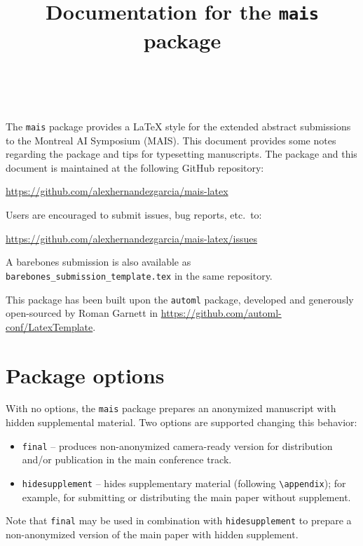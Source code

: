 \documentclass[11pt]{article}
\title{Documentation for the \texttt{mais} package}
\author[1]{\nameemail{Author 1}{email1@example.com}}
\author[2,3]{\nameemail{Author 2}{email2@example.com}}
\author[3]{\nameemail{Author 3}{email3@example.com}}
\author[4]{\nameemail{Author 4}{email4@example.com}}
\author[3]{\\\nameemail{Author 5}{email5@example.com}}
\affil[1]{Institution 1}
\affil[2]{Institution 2}
\affil[3]{Institution 3}
\affil[4]{Institution 4}
\begin{document}
\maketitle

The \texttt{mais} package provides a \LaTeX{} style for the extended abstract submissions to the Montreal AI Symposium (MAIS). This document provides some notes regarding the package and tips for typesetting manuscripts. The package and this document is maintained at the following GitHub
repository:

\begin{center}
  \url{https://github.com/alexhernandezgarcia/mais-latex}
\end{center}

Users are encouraged to submit issues, bug reports, etc.\ to:

\begin{center}
  \url{https://github.com/alexhernandezgarcia/mais-latex/issues}
\end{center}

A barebones submission is also available as \texttt{barebones\_submission\_template.tex} in the same repository.

This package has been built upon the \texttt{automl} package, developed and generously open-sourced by Roman Garnett in \url{https://github.com/automl-conf/LatexTemplate}.

\section{Package options}

With no options, the \texttt{mais} package prepares an anonymized manuscript with hidden supplemental material. Two options are supported changing this behavior:

\begin{itemize}
\item \texttt{final} -- produces non-anonymized camera-ready version for distribution and/or publication in the main conference track.
\item \texttt{hidesupplement} -- hides supplementary material (following \verb|\appendix|); for example, for submitting or distributing the main paper without supplement.
\end{itemize}

Note that \texttt{final} may be used in combination with \texttt{hidesupplement} to prepare a non-anonymized version of the main paper with hidden supplement.
\end{document}
